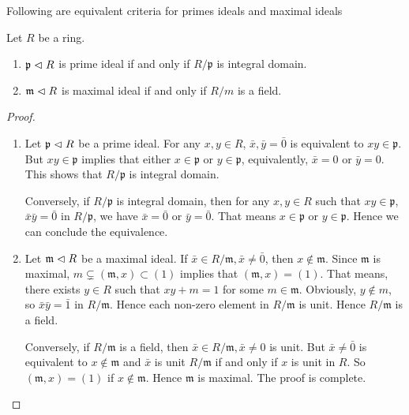 \documentclass{amsart}
\begin{document}
Following are equivalent criteria for primes ideals and maximal ideals
\begin{secprop}
	Let $R$ be a ring.
	\begin{enumerate}
		\item $\mathfrak{p} \vartriangleleft R$ is prime ideal if and only if $R/\mathfrak{p}$ is integral domain.
		\item $\mathfrak{m} \vartriangleleft R$ is maximal ideal if and only if $R/m$ is a field.
	\end{enumerate}
\end{secprop}
\begin{proof}
	\begin{enumerate}
		\item Let $\mathfrak{p} \vartriangleleft R$ be a prime ideal. For any $x,y \in R$, $\bar{x},\bar{y} = \bar{0}$ is equivalent to $xy \in \mathfrak{p}$. But $xy \in \mathfrak{p}$ implies that either $x \in \mathfrak{p}$ or $y \in \mathfrak{p}$, equivalently, $\bar{x}=0$ or $\bar{y}=0$. This shows that $R/\mathfrak{p}$ is integral domain. 
		
		Conversely, if $R/\mathfrak{p}$ is integral domain, then for any $x,y \in R$ such that $xy \in \mathfrak{p}$, $\bar{x} \bar{y} = \bar{0}$ in $R/\mathfrak{p}$, we have $\bar{x}=\bar{0}$ or $\bar{y} = \bar{0}$. That means $x \in \mathfrak{p}$ or $y \in \mathfrak{p}$. Hence we can conclude the equivalence.
		\item Let $\mathfrak{m} \vartriangleleft R$ be a maximal ideal. If $ \bar{x} \in R/\mathfrak{m}, \bar{x} \neq \bar{0}$, then $x \notin \mathfrak{m}$. Since $\mathfrak{m}$ is maximal, $m \subsetneq (\mathfrak{m}, x) \subset (1)$ implies that $(\mathfrak{m},x) = (1)$. That means, there exists $y \in R$ such that $xy +m=1 $ for some $m \in \mathfrak{m}$. Obviously, $y \notin m$, so $\bar{x} \bar{y} = \bar{1}$ in $R/\mathfrak{m}$. Hence each non-zero element in $R/\mathfrak{m}$ is unit. Hence $R/\mathfrak{m}$ is a field.
		
		Conversely, if $R/\mathfrak{m}$ is a field, then $\bar{x} \in R/\mathfrak{m}, \bar{x} \neq 0$ is unit. But $\bar{x} \neq \bar{0}$ is equivalent to $x \notin \mathfrak{m}$ and $\bar{x}$ is unit $R/\mathfrak{m}$ if and only if $x$ is unit in $R$. So $(\mathfrak{m}, x) = (1)$ if $x \notin \mathfrak{m}$. Hence $\mathfrak{m}$ is maximal. The proof is complete. 
	\end{enumerate}
\end{proof}
\end{document}

